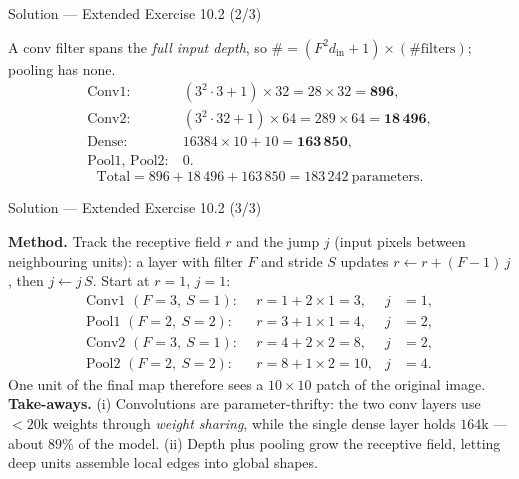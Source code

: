 \documentclass[aspectratio=169,11pt]{beamer}
\begin{document}
\begin{frame}{Solution --- Extended Exercise 10.2 (2/3)}
\begin{solutionbox}
  A conv filter spans the \emph{full input depth}, so
  $\#=(F^2 d_{\text{in}}+1)\times(\text{\#filters})$; pooling has none.
  \[
    \begin{aligned}
      \text{Conv1}:&\ (3^2\cdot3+1)\times32=28\times32=\mathbf{896},\\
      \text{Conv2}:&\ (3^2\cdot32+1)\times64=289\times64=\mathbf{18\,496},\\
      \text{Dense}:&\ 16384\times10+10=\mathbf{163\,850},\\
      \text{Pool1, Pool2}:&\ 0 .
    \end{aligned}
  \]
  \[
    \text{Total}=896+18\,496+163\,850=\boxed{183\,242}\ \text{parameters.}
  \]
\end{solutionbox}
\end{frame}

\begin{frame}{Solution --- Extended Exercise 10.2 (3/3)}
\begin{solutionbox}
  \textbf{Method.} Track the receptive field $r$ and the jump $j$ (input
  pixels between neighbouring units): a layer with filter $F$ and stride $S$
  updates $r \leftarrow r + (F-1)\,j$, then $j \leftarrow j\,S$. Start at
  $r=1$, $j=1$:
  \[
    \begin{aligned}
      \text{Conv1 } (F{=}3,\ S{=}1):&\ \ r = 1 + 2\times1 = 3, & j &= 1,\\
      \text{Pool1 } (F{=}2,\ S{=}2):&\ \ r = 3 + 1\times1 = 4, & j &= 2,\\
      \text{Conv2 } (F{=}3,\ S{=}1):&\ \ r = 4 + 2\times2 = 8, & j &= 2,\\
      \text{Pool2 } (F{=}2,\ S{=}2):&\ \ r = 8 + 1\times2 = 10, & j &= 4.
    \end{aligned}
  \]
  One unit of the final map therefore sees a $10\times10$ patch of the original image.
  \medskip
  \textbf{Take-aways.} (i) Convolutions are parameter-thrifty: the two conv layers use
  $<20$k weights through \emph{weight sharing}, while the single dense layer holds $164$k
  --- about $89\%$ of the model. (ii) Depth plus pooling grow the receptive field, letting
  deep units assemble local edges into global shapes.
\end{solutionbox}
\end{frame}
\end{document}
